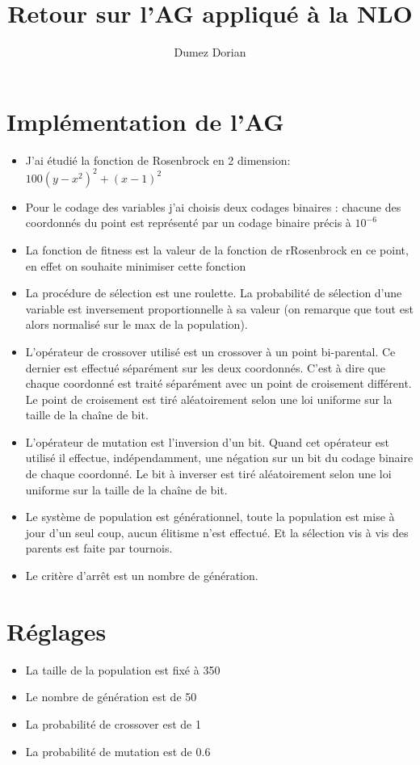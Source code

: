 \documentclass[12pt,a4paper]{article}
\begin{document}
\title{Retour sur l'AG appliqué à la NLO}

\author{Dumez Dorian}

\maketitle

\section{Implémentation de l'AG}
\begin{itemize}
\item
J'ai étudié la fonction de Rosenbrock en 2 dimension: $100(y - x^2)^2 + (x-1)^2$
\item
Pour le codage des variables j'ai choisis deux codages binaires : chacune des coordonnés du point est représenté par un codage binaire précis à $10^{-6}$
\item
La fonction de fitness est la valeur de la fonction de rRosenbrock en ce point, en effet on souhaite minimiser cette fonction
\item
La procédure de sélection est une roulette. La probabilité de sélection d'une variable est inversement proportionnelle à sa valeur (on remarque que tout est alors normalisé sur le max de la population).
\item
L'opérateur de crossover utilisé est un crossover à un point bi-parental. Ce dernier est effectué séparément sur les deux coordonnés. C'est à dire que chaque coordonné est traité séparément avec un point de croisement différent. Le point de croisement est tiré aléatoirement selon une loi uniforme sur la taille de la chaîne de bit.
\item
L'opérateur de mutation est l'inversion d'un bit. Quand cet opérateur est utilisé il effectue, indépendamment, une négation sur un bit du codage binaire de chaque coordonné. Le bit à inverser est tiré aléatoirement selon une loi uniforme sur la taille de la chaîne de bit.
\item
Le système de population est générationnel, toute la population est mise à jour d'un seul coup, aucun élitisme n'est effectué. Et la sélection vis à vis des parents est faite par tournois.
\item
Le critère d’arrêt est un nombre de génération.
\end{itemize}

\section{Réglages}
\begin{itemize}
\item
La taille de la population est fixé à 350
\item
Le nombre de génération est de 50
\item
La probabilité de crossover est de 1
\item
La probabilité de mutation est de 0.6
\end{itemize}
\end{document}
